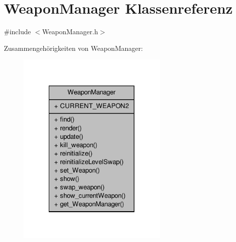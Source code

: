 \hypertarget{class_weapon_manager}{\section{Weapon\-Manager Klassenreferenz}
\label{class_weapon_manager}
}


{\ttfamily \#include $<$Weapon\-Manager.\-h$>$}



Zusammengehörigkeiten von Weapon\-Manager\-:
\nopagebreak
\begin{figure}[H]
\begin{center}
\leavevmode
\includegraphics[width=210pt]{class_weapon_manager__coll__graph}
\end{center}
\end{figure}
